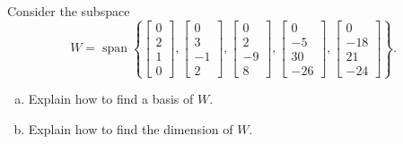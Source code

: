 
\begin{exerciseStatement}


Consider the subspace \[W=\operatorname{span}  \left\{ \left[\begin{array}{c}
0 \\
2 \\
1 \\
0
\end{array}\right] , \left[\begin{array}{c}
0 \\
3 \\
-1 \\
2
\end{array}\right] , \left[\begin{array}{c}
0 \\
2 \\
-9 \\
8
\end{array}\right] , \left[\begin{array}{c}
0 \\
-5 \\
30 \\
-26
\end{array}\right] , \left[\begin{array}{c}
0 \\
-18 \\
21 \\
-24
\end{array}\right] \right\} .\]


\begin{enumerate}[(a)]
\item  Explain how to find a basis of \(W\).
\item  Explain how to find the dimension of \(W\).
\end{enumerate}
    
\end{exerciseStatement}
    

